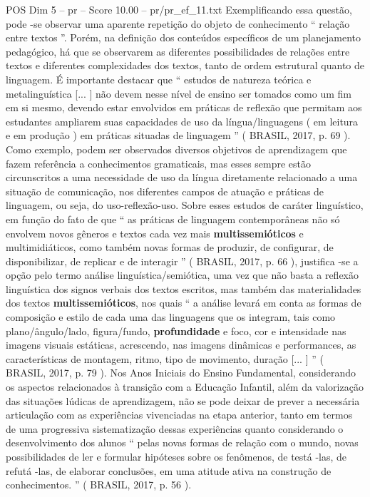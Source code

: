 \begin{textsample}{POS Dim 5 – pr – Score 10.00 – pr/pr\_ef\_11.txt}
Exemplificando essa questão, pode -se observar uma aparente repetição do objeto de conhecimento “ relação entre textos ”.
Porém, na definição dos conteúdos específicos de um planejamento pedagógico, há que se observarem as diferentes possibilidades de relações entre textos e diferentes complexidades dos textos, tanto de ordem estrutural quanto de linguagem.
É importante destacar que “ estudos de natureza teórica e metalinguística [... ] não devem nesse nível de ensino ser tomados como um fim em si mesmo, devendo estar envolvidos em práticas de reflexão que permitam aos estudantes ampliarem suas capacidades de uso da língua/linguagens ( em leitura e em produção ) em práticas situadas de linguagem ” ( BRASIL, 2017, p. 69 ).
Como exemplo, podem ser observados diversos objetivos de aprendizagem que fazem referência a conhecimentos gramaticais, mas esses sempre estão circunscritos a uma necessidade de uso da língua diretamente relacionado a uma situação de comunicação, nos diferentes campos de atuação e práticas de linguagem, ou seja, do uso-reflexão-uso.
Sobre esses estudos de caráter linguístico, em função do fato de que “ as práticas de linguagem contemporâneas não só envolvem novos gêneros e textos cada vez mais \textbf{multissemióticos} e multimidiáticos, como também novas formas de produzir, de configurar, de disponibilizar, de replicar e de interagir ” ( BRASIL, 2017, p. 66 ), justifica -se a opção pelo termo análise linguística/semiótica, uma vez que não basta a reflexão linguística dos signos verbais dos textos escritos, mas também das materialidades dos textos \textbf{multissemióticos}, nos quais “ a análise levará em conta as formas de composição e estilo de cada uma das linguagens que os integram, tais como plano/ângulo/lado, figura/fundo, \textbf{profundidade} e foco, cor e intensidade nas imagens visuais estáticas, acrescendo, nas imagens dinâmicas e performances, as características de montagem, ritmo, tipo de movimento, duração [... ] ” ( BRASIL, 2017, p. 79 ).
Nos Anos Iniciais do Ensino Fundamental, considerando os aspectos relacionados à transição com a Educação Infantil, além da valorização das situações lúdicas de aprendizagem, não se pode deixar de prever a necessária articulação com as experiências vivenciadas na etapa anterior, tanto em termos de uma progressiva sistematização dessas experiências quanto considerando o desenvolvimento dos alunos “ pelas novas formas de relação com o mundo, novas possibilidades de ler e formular hipóteses sobre os fenômenos, de testá -las, de refutá -las, de elaborar conclusões, em uma atitude ativa na construção de conhecimentos. ” ( BRASIL, 2017, p. 56 ).

\end{textsample}
